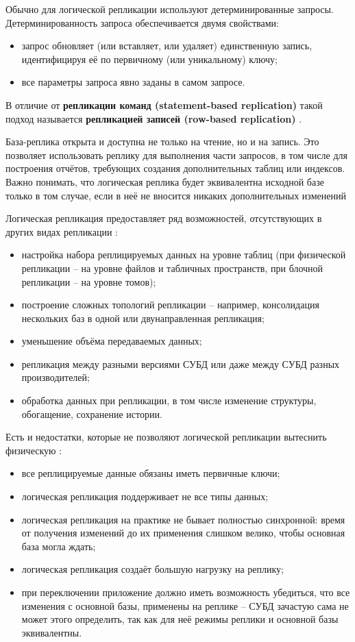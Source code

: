 Обычно для логической репликации используют детерминированные запросы. Детерминированность запроса обеспечивается двумя
свойствами:
\begin{itemize}
    \item запрос обновляет (или вставляет, или удаляет) единственную запись, идентифицируя её по первичному (или уникальному) ключу;
    \item все параметры запроса явно заданы в самом запросе.
\end{itemize}

В отличие от \textbf{репликации команд (statement-based replication)} такой подход называется \textbf{репликацией
записей (row-based replication)} \autocite{PhysLogPeplic}.

База-реплика открыта и доступна не только на чтение, но и на запись. Это позволяет использовать реплику для выполнения
части запросов, в том числе для построения отчётов, требующих создания дополнительных таблиц или индексов. Важно
понимать, что логическая реплика будет эквивалентна исходной базе только в том случае, если в неё не вносится никаких
дополнительных изменений

Логическая репликация предоставляет ряд возможностей, отсутствующих в других видах репликации \autocite{PhysLogPeplic}:
\begin{itemize}
    \item настройка набора реплицируемых данных на уровне таблиц (при физической репликации – на уровне файлов и табличных пространств, при блочной репликации – на уровне томов);
    \item построение сложных топологий репликации – например, консолидация нескольких баз в одной или двунаправленная репликация;
    \item уменьшение объёма передаваемых данных;
    \item репликация между разными версиями СУБД или даже между СУБД разных производителей;
    \item обработка данных при репликации, в том числе изменение структуры, обогащение, сохранение истории.
\end{itemize}

Есть и недостатки, которые не позволяют логической репликации вытеснить физическую \autocite{PhysLogPeplic}:
\begin{itemize}
    \item все реплицируемые данные обязаны иметь первичные ключи;
    \item логическая репликация поддерживает не все типы данных;
    \item логическая репликация на практике не бывает полностью синхронной: время от получения изменений до их применения слишком велико, чтобы основная база могла ждать;
    \item логическая репликация создаёт большую нагрузку на реплику;
    \item при переключении приложение должно иметь возможность убедиться, что все изменения с основной базы, применены на реплике – СУБД зачастую сама не может этого определить, так как для неё режимы реплики и основной базы эквивалентны.
\end{itemize}

